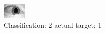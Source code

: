 \begin{figure}[h!]
\begin{center}
\includegraphics[width=0.60\columnwidth]{figures/ID1580_class_2_target_1.png}
\end{center}
\caption{ Classification: 2 actual target: 1}
\label{fig:ID1580_class_2_target_1}
\end{figure}
